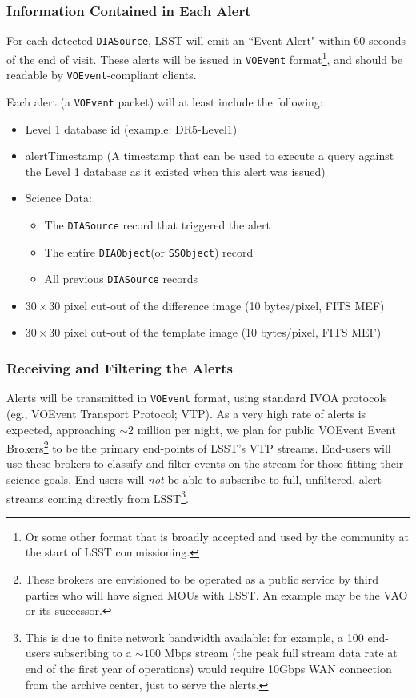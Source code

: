 \documentclass[12pt]{article}
\newcommand{\code}[1]{\texttt{#1}}
\newcommand{\DIASource}{\code{DIASource}\xspace}
\newcommand{\DIAObject}{\code{DIAObject}\xspace}
\newcommand{\DB}{{Level 1 database}\xspace}
\newcommand{\SSObject}{\code{SSObject}\xspace}
\newcommand{\VOEvent}{\code{VOEvent}\xspace}
\begin{document}
\subsubsection{Information Contained in Each Alert}

For each detected \DIASource, LSST will emit an ``Event Alert" within 60 seconds of the end of visit. These alerts will be issued in \VOEvent format\footnote{Or some other format that is broadly accepted and used by the community at the start of LSST commissioning.}, and should be readable by \VOEvent-compliant clients.

\vspace{1em}
Each alert (a \VOEvent packet) will at least include the following:

\begin{itemize}
\item \DB id (example: DR5-Level1)
\item alertTimestamp (A timestamp that can be used to execute a query against the \DB as it existed when this alert was issued)
\item Science Data:
    \begin{itemize}
    \item The \DIASource record that triggered the alert
    \item The entire \DIAObject (or \SSObject) record
    \item All previous \DIASource records
    \end{itemize}
\item $30\times 30$ pixel cut-out of the difference image (10 bytes/pixel, FITS MEF)
\item $30\times 30$ pixel cut-out of the template image (10 bytes/pixel, FITS MEF)
\end{itemize}

\subsubsection{Receiving and Filtering the Alerts}
\label{sec:eventbrokers}

Alerts will be transmitted in \VOEvent format, using standard IVOA protocols (eg., VOEvent Transport Protocol; VTP). As a very high rate of alerts is expected, approaching $\sim 2$ million per night, we plan for public VOEvent Event Brokers\footnote{These brokers are envisioned to be operated as a public service by third parties who will have signed MOUs with LSST. An example may be the VAO or its successor.} to be the primary end-points of LSST's VTP streams. End-users will use these brokers to classify and filter events on the stream for those fitting their science goals. End-users will {\em not} be able to subscribe to full, unfiltered, alert streams coming directly from LSST\footnote{This is due to finite network bandwidth available: for example, a 100 end-users subscribing to a $\sim 100$ Mbps stream (the peak full stream data rate at end of the first year of operations) would require 10Gbps WAN connection from the archive center, just to serve the alerts.}.
\end{document}
